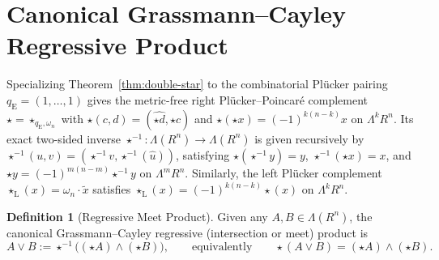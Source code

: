 \documentclass[11pt]{article}
\theoremstyle{definition}
\newtheorem{definition}[theorem]{Definition}
\begin{document}
\section{Canonical Grassmann--Cayley Regressive Product}

Specializing Theorem~\ref{thm:double-star} to the combinatorial Pl\"ucker pairing $q_{\mathrm{E}} = (1, \dots, 1)$ gives the metric-free right Pl\"ucker--Poincar\'e complement $\star = \star_{q_{\mathrm{E}}, \omega_n}$ with $\star(c, d) = (\widehat{\star d}, \star c)$ and $\star(\star x) = (-1)^{k(n-k)} x$ on $\Lambda^k R^n$. Its exact two-sided inverse $\star^{-1} : \Lambda(R^n) \to \Lambda(R^n)$ is given recursively by $\star^{-1}(u, v) = (\star^{-1} v, \star^{-1}(\hat{u}))$, satisfying $\star(\star^{-1} y) = y$, $\star^{-1}(\star x) = x$, and $\star y = (-1)^{m(n-m)} \star^{-1} y$ on $\Lambda^m R^n$. Similarly, the left Pl\"ucker complement $\star_{\mathrm{L}}(x) = \omega_n \cdot \widetilde{x}$ satisfies $\star_{\mathrm{L}}(x) = (-1)^{k(n-k)} \star(x)$ on $\Lambda^k R^n$.

\begin{definition}[Regressive Meet Product]\label{def:vee}
Given any $A, B \in \Lambda(R^n)$, the canonical Grassmann--Cayley regressive (intersection or meet) product is
\begin{equation}\label{eq:vee-def}
A \vee B := \star^{-1}\bigl((\star A) \wedge (\star B)\bigr),
\qquad\text{equivalently}\qquad
\star(A \vee B) = (\star A) \wedge (\star B).
\end{equation}
\end{definition}
\end{document}
